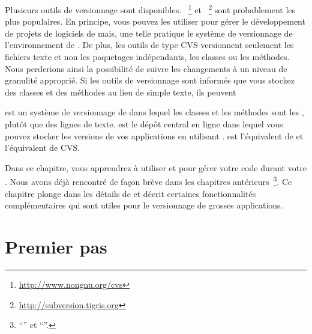 \documentclass[a4paper,10pt,twoside]{book}
\begin{document}
Plusieurs outils de versionnage sont
disponibles. ~\footnote{\url{http://www.nongnu.org/cvs}} et
~\footnote{\url{http://subversion.tigris.org}} sont
probablement les plus populaires.
En principe, vous pouvez les utiliser pour gérer le développement
de projets de logiciels de \pharo mais, une telle pratique
 le système de versionnage de l'environnement
de \pharo. %
De plus, les outils de type CVS versionnent seulement les fichiers
texte et non les paquetages indépendants, les classes ou les
méthodes. Nous perderions ainsi la possibilité de suivre les
changements à un niveau de granulité approprié.
Si les outils de versionnage sont informés que vous stockez des
classes et des méthodes au lieu de simple texte, ils peuvent 


\emph{\indmain{\MC{}}} est un système de versionnage de \pharo
dans lequel les classes et les méthodes sont les , plutôt que des lignes de texte.
 \emph{\sqsrc{}} est le dépôt central en ligne dans lequel vous pouvez
 stocker les versions de vos applications en utilisant \MC. \sqsrc est
 l'équivalent de  et \MC l'équivalent de CVS.

Dans ce chapitre, vous apprendrez à utiliser \MC et
\sqsrc pour gérer votre code durant votre . %
Nous avons déjà rencontré de façon brève \MC dans les chapitres
antérieurs~\footnote{``\titreFirstapp'' et  ``\titreEnvironment''.}.
Ce chapitre plonge dans les détails de 
 \MC{} et décrit certaines fonctionnalités complémentaires qui sont
 utiles pour le versionnage de grosses applications.

\section{Premier pas} %
\end{document}
